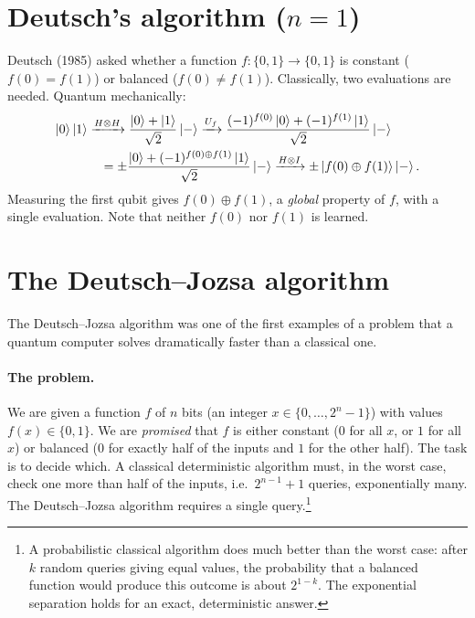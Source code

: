 \section{Deutsch's algorithm ($n=1$)}
Deutsch (1985) asked whether a function $f:\{0,1\}\to\{0,1\}$ is constant ($f(0)=f(1)$) or balanced ($f(0)\neq f(1)$). Classically, two evaluations are needed. Quantum mechanically:
\begin{align}
  \left|0\right\rangle\left|1\right\rangle&\xrightarrow{H\otimes H}\frac{\left|0\right\rangle+\left|1\right\rangle}{\sqrt2}\left|-\right\rangle\xrightarrow{U_f}\frac{(-1)^{f(0)}\left|0\right\rangle+(-1)^{f(1)}\left|1\right\rangle}{\sqrt2}\left|-\right\rangle\nonumber\\
  &\quad=\pm\frac{\left|0\right\rangle+(-1)^{f(0)\oplus f(1)}\left|1\right\rangle}{\sqrt2}\left|-\right\rangle\xrightarrow{H\otimes I}\pm\left|f(0)\oplus f(1)\right\rangle\left|-\right\rangle .
\end{align}
Measuring the first qubit gives $f(0)\oplus f(1)$, a \emph{global} property of $f$, with a single evaluation. Note that neither $f(0)$ nor $f(1)$ is learned.

\section{The Deutsch--Jozsa algorithm}
The Deutsch--Jozsa algorithm \cite{DeutschJozsa1992} was one of the first examples of a problem that a quantum computer solves dramatically faster than a classical one.

\paragraph{The problem.} We are given a function $f$ of $n$ bits (an integer $x\in\{0,\dots,2^n-1\}$) with values $f(x)\in\{0,1\}$. We are \emph{promised} that $f$ is either constant ($0$ for all $x$,
or $1$ for all $x$) or balanced ($0$ for exactly half of the inputs and $1$ for the other half). The task is to decide which. A classical deterministic algorithm must, in the worst case, check one more
than half of the inputs, i.e.\ $2^{n-1}+1$ queries, exponentially many. The Deutsch--Jozsa algorithm requires a single query.\footnote{A probabilistic classical algorithm does much better than the worst
case: after $k$ random queries giving equal values, the probability that a balanced function would produce this outcome is about $2^{1-k}$. The exponential separation holds for an exact, deterministic answer.}

